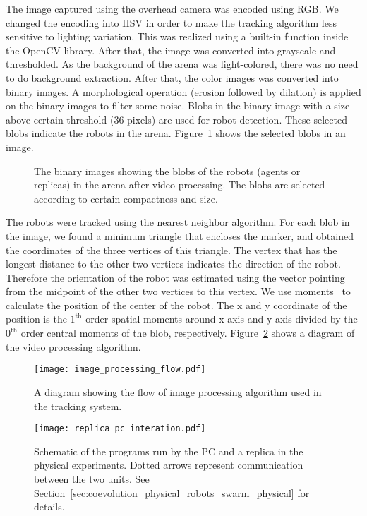 The image captured using the overhead camera was encoded using RGB. We changed the encoding into HSV in order to make the tracking algorithm less sensitive to lighting variation. This was realized using a built-in function inside the OpenCV library. After that, the image was converted into grayscale and thresholded. As the background of the arena was light-colored, there was no need to do background extraction. After that, the color images was converted into binary images. A morphological operation (erosion followed by dilation) is applied on the binary images to filter some noise. Blobs in the binary image with a size above certain threshold (36 pixels) are used for robot detection. These selected blobs indicate the robots in the arena. Figure~\ref{fig:binary_image_individuals} shows the selected blobs in an image. 
%
\begin{figure}[!t]%
	\centering
		\caption{The binary images showing the blobs of the robots (agents or replicas) in the arena after video processing. The blobs are selected according to certain compactness and size.}
		\label{fig:binary_image_individuals}
\end{figure}
%

The robots were tracked using the nearest neighbor algorithm. For each blob in the image, we found a minimum triangle that encloses the marker, and obtained the coordinates of the three vertices of this triangle. The vertex that has the longest distance to the other two vertices indicates the direction of the robot. Therefore the orientation of the robot was estimated using the vector pointing from the midpoint of the other two vertices to this vertex. We use moments~\citep{Hu1962} to calculate the position of the center of the robot. The x and y coordinate of the position is the $1^\mathrm{th}$ order spatial moments around x-axis and y-axis divided by the $0^\mathrm{th}$ order central moments of the blob, respectively. Figure~\ref{fig:image_processing_flow} shows a diagram of the video processing algorithm. 
%
\begin{figure}[!t]
    \centering
    \texttt{[image: image\_processing\_flow.pdf]}
    \caption{A diagram showing the flow of image processing algorithm used in the tracking system.}
    \label{fig:image_processing_flow}
\end{figure} 
%
%
\begin{figure}[!t]
    \centering
    \texttt{[image: replica\_pc\_interation.pdf]}
    \caption{Schematic of the programs run by the PC and a replica in the physical experiments. Dotted arrows represent communication between the two units. See Section~\ref{sec:coevolution_physical_robots_swarm_physical} for details.}
    \label{fig:agent_pc_interation}
\end{figure} 
%
